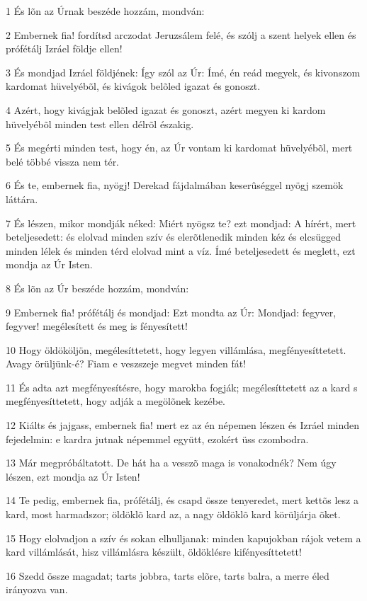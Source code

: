 \par 1 És lõn az Úrnak beszéde hozzám, mondván:
\par 2 Embernek fia! fordítsd arczodat Jeruzsálem felé, és szólj a szent helyek ellen és prófétálj Izráel földje ellen!
\par 3 És mondjad Izráel földjének: Így szól az Úr: Ímé, én reád megyek, és kivonszom kardomat hüvelyébõl, és kivágok belõled igazat és gonoszt.
\par 4 Azért, hogy kivágjak belõled igazat és gonoszt, azért megyen ki kardom hüvelyébõl minden test ellen délrõl északig.
\par 5 És megérti minden test, hogy én, az Úr vontam ki kardomat hüvelyébõl, mert belé többé vissza nem tér.
\par 6 És te, embernek fia, nyögj! Derekad fájdalmában keserûséggel nyögj szemök láttára.
\par 7 És lészen, mikor mondják néked: Miért nyögsz te? ezt mondjad: A hírért, mert beteljesedett: és elolvad minden szív és elerõtlenedik minden kéz és elcsügged minden lélek és minden térd elolvad mint a víz. Ímé beteljesedett és meglett, ezt mondja az Úr Isten.
\par 8 És lõn az Úr beszéde hozzám, mondván:
\par 9 Embernek fia! prófétálj és mondjad: Ezt mondta az Úr: Mondjad: fegyver, fegyver! megélesített és meg is fényesített!
\par 10 Hogy öldököljön, megélesíttetett, hogy legyen villámlása, megfényesíttetett. Avagy örüljünk-é? Fiam e veszszeje megvet minden fát!
\par 11 És adta azt megfényesítésre, hogy marokba fogják; megélesíttetett az a kard s megfényesíttetett, hogy adják a megölõnek kezébe.
\par 12 Kiálts és jajgass, embernek fia! mert ez az én népemen lészen és Izráel minden fejedelmin: e kardra jutnak népemmel együtt, ezokért üss czombodra.
\par 13 Már megpróbáltatott. De hát ha a vesszõ maga is vonakodnék? Nem úgy lészen, ezt mondja az Úr Isten!
\par 14 Te pedig, embernek fia, prófétálj, és csapd össze tenyeredet, mert kettõs lesz a kard, most harmadszor; öldöklõ kard az, a nagy öldöklõ kard körüljárja õket.
\par 15 Hogy elolvadjon a szív és sokan elhulljanak: minden kapujokban rájok vetem a kard villámlását, hisz villámlásra készült, öldöklésre kifényesíttetett!
\par 16 Szedd össze magadat; tarts jobbra, tarts elõre, tarts balra, a merre éled irányozva van.
